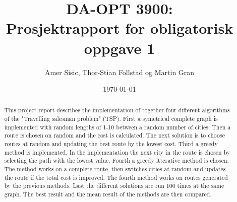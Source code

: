 \documentclass[12pt]{article}
\title{DA-OPT 3900:\\Prosjektrapport for obligatorisk oppgave 1}
\author{Amer Sisic, Thor-Stian Follstad og Martin Gran}
\date{\today}
\begin{document}
\setcounter{section}{1}

\maketitle
\thispagestyle{myheadings}
\linespread{1.00}
\vspace{\fill}
\begin{abstract}
				This project report describes the implementation of together four different algorithms of the "Travelling salesman problem" (TSP).
				First a symetrical complete graph is implemented with random lengths of 1-10 between a random number of cities. Then a route is 
				chosen on random and the cost is calculated. The next solution is to choose routes at random and updating the best route by the 
				lowest cost. Third a greedy method is implemented. In the implementation the next city in the route is chosen by selecting
				the path with the lowest value. Fourth a greedy itterative method is chosen. The method works on a complete route, then switches
				cities at random and updates the route if the total cost is improved. The fourth method works on routes generated by the previous
				methods. Last the different solutions are run 100 times at the same graph. The best result and the mean result of the methods are then compared.
\\ \\ \\ \\ \\ \\ \\ \\ \\
\end{abstract}
\vspace{\fill}
\pagebreak
\thispagestyle{empty}%
\tableofcontents
\pagebreak
\end{document}
